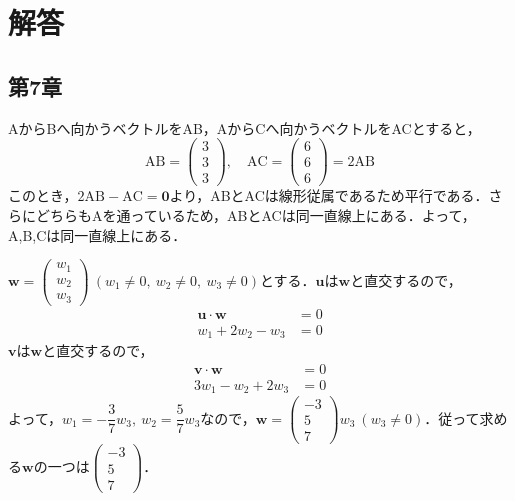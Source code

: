 \section*{解答}
\subsection*{第7章} \setcounter{section}{7}
\begin{ans}
AからBへ向かうベクトルをAB，AからCへ向かうベクトルをACとすると，
\[\text{AB}=\begin{pmatrix} 3 \\ 3 \\ 3\end{pmatrix},\quad \text{AC}=\begin{pmatrix} 6 \\ 6 \\ 6\end{pmatrix}=2\text{AB}\]
このとき，$2\text{AB}-\text{AC}=\bm{0}$より，ABとACは線形従属であるため平行である．さらにどちらもAを通っているため，ABとACは同一直線上にある．よって，A,B,Cは同一直線上にある．
\end{ans}

\begin{ans}
$\bm{w}=\begin{pmatrix} w_1 \\ w_2 \\ w_3\end{pmatrix}\ (w_1\neq0,\ w_2\neq0,\ w_3\neq0)$とする．$\bm{u}$は$\bm{w}$と直交するので，
\begin{align*}
\bm{u}\cdot\bm{w}&=0\\
w_1+2w_2-w_3&=0
\end{align*}
$\bm{v}$は$\bm{w}$と直交するので，
\begin{align*}
\bm{v}\cdot\bm{w}&=0\\
3w_1-w_2+2w_3&=0
\end{align*}
よって，$w_1=-\dfrac{3}{7}w_3,\ w_2=\dfrac{5}{7}w_3$なので，$\bm{w}=\begin{pmatrix} -3 \\ 5 \\ 7\end{pmatrix}w_3\ (w_3\neq0)$．従って求める$\bm{w}$の一つは$\begin{pmatrix} -3 \\ 5 \\ 7\end{pmatrix}$．
\end{ans}

